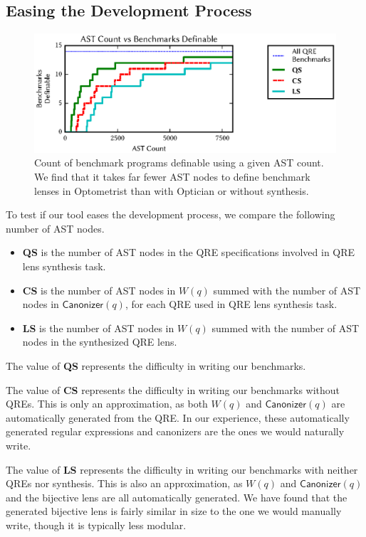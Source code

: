 \documentclass[acmsmall,review,anonymous]{acmart}\settopmatter{printfolios=true,printccs=false,printacmref=false}
\newcommand{\kw}[1]{\ensuremath{\mathsf{#1}}}
\newcommand{\canonizer}{\ensuremath{\kw{Canonizer}}}
\newcommand{\Name}{Optometrist}
\newcommand{\QRESize}{\textbf{QS}}
\newcommand{\CanonizerAndSpecSize}{\textbf{CS}}
\newcommand{\LensAndSpecSize}{\textbf{LS}}
\begin{document}
\subsection{Easing the Development Process}

\begin{figure}
\includegraphics{generated-graphs/asts.eps}
\caption{Count of benchmark programs definable using a given AST count. We find
  that it takes far fewer AST nodes to define benchmark lenses in \Name{} than
  with Optician or without synthesis. }
\label{fig:asts}
\end{figure}

To test if our tool eases the development process, we compare the following
number of AST nodes.
%
\begin{itemize}
  \item[\QRESize{}] \QRESize{} is the number of AST nodes in the QRE
  specifications involved in QRE lens synthesis task.
  \item[\CanonizerAndSpecSize{}] \CanonizerAndSpecSize{} is the number of
  AST nodes in $W(q)$ summed with the number of AST nodes in $\canonizer(q)$,
  for each QRE used in QRE lens synthesis task.
  \item[\LensAndSpecSize{}] \LensAndSpecSize{} is the number of AST nodes
  in $W(q)$ summed with the number of AST nodes in the synthesized QRE lens.
\end{itemize}

The value of \QRESize{} represents the difficulty in writing our benchmarks.

The value of \CanonizerAndSpecSize{} represents the difficulty in writing our
benchmarks without QREs.  This is only an approximation, as both $W(q)$ and
$\canonizer(q)$ are automatically generated from the QRE.  In our
experience, these automatically generated regular expressions and canonizers are
the ones we would naturally write.

The value of \LensAndSpecSize{} represents the difficulty in writing our benchmarks
with neither QREs nor synthesis.  This is also an approximation, as $W(q)$ and
$\canonizer(q)$ and the bijective lens are all automatically generated.
We have found that the generated bijective lens is fairly similar in size to the
one we would manually write, though it is typically less modular.
\end{document}
